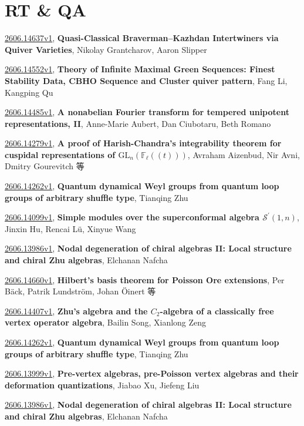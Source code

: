 \documentclass[9pt, a4paper]{article}
\theoremstyle{plain}
\theoremstyle{definition}
\theoremstyle{remark}
\newcommand{\arxiv}[3]{\href{https://arxiv.org/abs/#1}{#1}, \textbf{\textcolor{arxivblue}{#2}}, #3}
\begin{document}

\section{RT \& QA}
\arxiv{2606.14637v1}{Quasi-Classical Braverman--Kazhdan Intertwiners via Quiver Varieties}{Nikolay Grantcharov, Aaron Slipper}

\arxiv{2606.14552v1}{Theory of Infinite Maximal Green Sequences: Finest Stability Data, CBHO Sequence and Cluster quiver pattern}{Fang Li, Kangping Qu}

\arxiv{2606.14485v1}{A nonabelian Fourier transform for tempered unipotent representations, II}{Anne-Marie Aubert, Dan Ciubotaru, Beth Romano}

\arxiv{2606.14279v1}{A proof of Harish-Chandra's integrability theorem for cuspidal representations of $\mathrm{GL}_n(\mathbb F_\ell((t)))$}{Avraham Aizenbud, Nir Avni, Dmitry Gourevitch 等}

\arxiv{2606.14262v1}{Quantum dynamical Weyl groups from quantum loop groups of arbitrary shuffle type}{Tianqing Zhu}

\arxiv{2606.14099v1}{Simple modules over the superconformal algebra $\mathcal{S}^{\prime}(1,n)$}{Jinxin Hu, Rencai Lü, Xinyue Wang}

\arxiv{2606.13986v1}{Nodal degeneration of chiral algebras II: Local structure and chiral Zhu algebras}{Elchanan Nafcha}

\arxiv{2606.14660v1}{Hilbert's basis theorem for Poisson Ore extensions}{Per Bäck, Patrik Lundström, Johan Öinert 等}

\arxiv{2606.14407v1}{Zhu's algebra and the $C_2$-algebra of a classically free vertex operator algebra}{Bailin Song, Xianlong Zeng}

\arxiv{2606.14262v1}{Quantum dynamical Weyl groups from quantum loop groups of arbitrary shuffle type}{Tianqing Zhu}

\arxiv{2606.13999v1}{Pre-vertex algebras, pre-Poisson vertex algebras and their deformation quantizations}{Jiabao Xu, Jiefeng Liu}

\arxiv{2606.13986v1}{Nodal degeneration of chiral algebras II: Local structure and chiral Zhu algebras}{Elchanan Nafcha}

\end{document}
